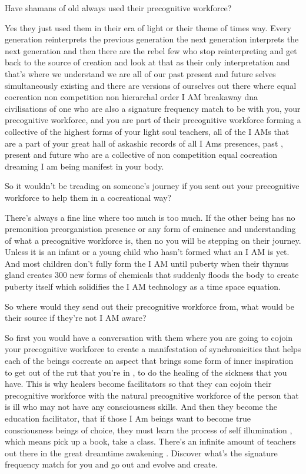 Have shamans of old always used their precognitive workforce?

Yes they just used them in their era of light or their theme of times
way. Every generation reinterprets the previous generation the next
generation interprets the next generation and then there are the rebel
few who stop reinterpreting and get back to the source of creation and
look at that as their only interpretation and that's where we understand
we are all of our past present and future selves simultaneously existing
and there are versions of ourselves out there where equal cocreation non
competition non hierarchal order I AM breakaway dna civilisations of one
who are also a signature frequency match to be with you, your
precognitive workforce, and you are part of their precognitive workforce
forming a collective of the highest forms of your light soul teachers,
all of the I AMs that are a part of your great hall of askashic records
of all I Ams presences, past , present and future who are a collective
of non competition equal cocreation dreaming I am being manifest in your
body.

So it wouldn't be treading on someone's journey if you sent out your
precognitive workforce to help them in a cocreational way?

There's always a fine line where too much is too much. If the other
being has no premonition preorganistion presence or any form of eminence
and understanding of what a precognitive workforce is, then no you will
be stepping on their journey. Unless it is an infant or a young child
who hasn't formed what an I AM is yet. And most children don't fully
form the I AM until puberty when their thymus gland creates 300 new
forms of chemicals that suddenly floods the body to create puberty
itself which solidifies the I AM technology as a time space equation.

So where would they send out their precognitive workforce from, what
would be their source if they're not I AM aware?

So first you would have a conversation with them where you are going to
cojoin your precognitive workforce to create a manifestation of
synchronicities that helps each of the beings cocreate an aspect that
brings some form of inner inspiration to get out of the rut that you're
in , to do the healing of the sickness that you have. This is why
healers become facilitators so that they can cojoin their precognitive
workforce with the natural precognitive workforce of the person that is
ill who may not have any consciousness skills. And then they become the
education facilitator, that if those I Am beings want to become true
consciousness beings of choice, they must learn the process of self
illumination , which means pick up a book, take a class. There's an
infinite amount of teachers out there in the great dreamtime awakening .
Discover what's the signature frequency match for you and go out and
evolve and create.

